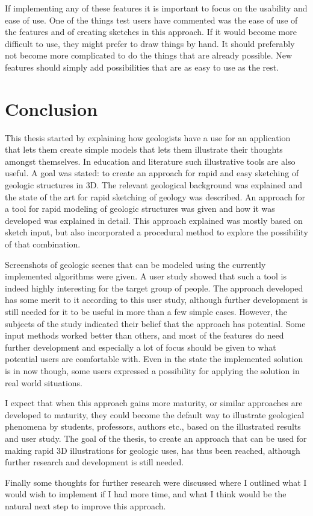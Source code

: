 \documentclass[a4paper,12pt]{report}
\begin{document}
If implementing any of these features it is important to focus on the usability and ease of use. One of the things test users have commented was the ease of use of the features and of creating sketches in this approach. If it would become more difficult to use, they might prefer to draw things by hand. It should preferably not become more complicated to do the things that are already possible. New features should simply add possibilities that are as easy to use as the rest.

\clearpage
\chapter{Conclusion}
\label{sec:conclusion}
This thesis started by explaining how geologists have a use for an application that lets them create simple models that lets them illustrate their thoughts amongst themselves. In education and literature such illustrative tools are also useful. A goal was stated: to create an approach for rapid and easy sketching of geologic structures in 3D. The relevant geological background was explained and the state of the art for rapid sketching of geology was described. An approach for a tool for rapid modeling of geologic structures was given and how it was developed was explained in detail. This approach explained was mostly based on sketch input, but also incorporated a procedural method to explore the possibility of that combination.

Screenshots of geologic scenes that can be modeled using the currently implemented algorithms were given. A user study showed that such a tool is indeed highly interesting for the target group of people. The approach developed has some merit to it according to this user study, although further development is still needed for it to be useful in more than a few simple cases. However, the subjects of the study indicated their belief that the approach has potential. Some input methods worked better than others, and most of the features do need further development and especially a lot of focus should be given to what potential users are comfortable with. Even in the state the implemented solution is in now though, some users expressed a possibility for applying the solution in real world situations.

I expect that when this approach gains more maturity, or similar approaches are developed to maturity, they could become the default way to illustrate geological phenomena by students, professors, authors etc., based on the illustrated results and user study. The goal of the thesis, to create an approach that can be used for making rapid 3D illustrations for geologic uses, has thus been reached, although further research and development is still needed.

Finally some thoughts for further research were discussed where I outlined what I would wish to implement if I had more time, and what I think would be the natural next step to improve this approach.

{}

\end{document}
